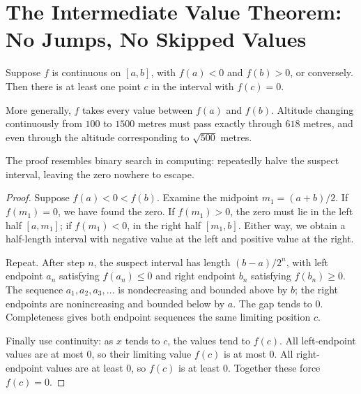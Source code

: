 \section{The Intermediate Value Theorem: No Jumps, No Skipped Values}

\begin{dingli}
Suppose $f$ is continuous on $[a,b]$, with $f(a)<0$ and $f(b)>0$, or conversely. Then there is at least one point $c$ in the interval with $f(c)=0$.
\end{dingli}

More generally, $f$ takes every value between $f(a)$ and $f(b)$. Altitude changing continuously from $100$ to $1500$ metres must pass exactly through $618$ metres, and even through the altitude corresponding to $\sqrt{500}$ metres.

The proof resembles binary search in computing: repeatedly halve the suspect interval, leaving the zero nowhere to escape.

\begin{proof}
Suppose $f(a)<0<f(b)$. Examine the midpoint $m_1=(a+b)/2$. If $f(m_1)=0$, we have found the zero. If $f(m_1)>0$, the zero must lie in the left half $[a,m_1]$; if $f(m_1)<0$, in the right half $[m_1,b]$. Either way, we obtain a half-length interval with negative value at the left and positive value at the right.

Repeat. After step $n$, the suspect interval has length $(b-a)/2^n$, with left endpoint $a_n$ satisfying $f(a_n)\le 0$ and right endpoint $b_n$ satisfying $f(b_n)\ge 0$. The sequence $a_1,a_2,a_3,\dots$ is nondecreasing and bounded above by $b$; the right endpoints are nonincreasing and bounded below by $a$. The gap tends to $0$. Completeness gives both endpoint sequences the same limiting position $c$.

Finally use continuity: as $x$ tends to $c$, the values tend to $f(c)$. All left-endpoint values are at most $0$, so their limiting value $f(c)$ is at most $0$. All right-endpoint values are at least $0$, so $f(c)$ is at least $0$. Together these force $f(c)=0$.
\end{proof}

\begin{center}
\end{center}

